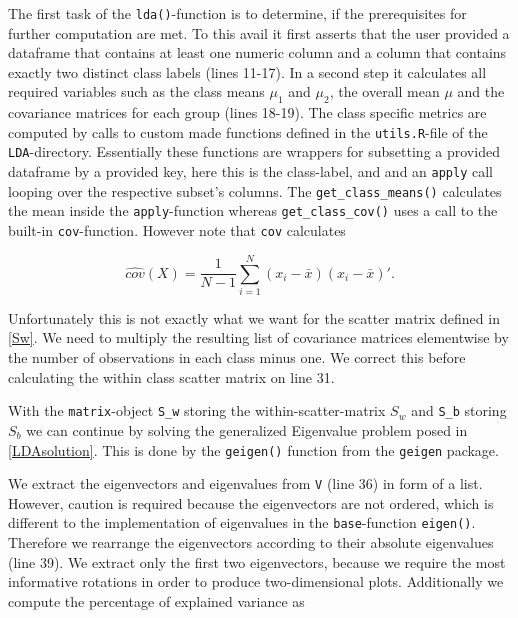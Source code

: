 \documentclass{article}
\begin{document}
The first task of the \texttt{lda()}-function is to determine, if the prerequisites for further computation are met. To this avail it first asserts that the user provided a dataframe that contains at least one numeric column and a column that contains exactly two distinct class labels (lines 11-17). In a second step it calculates all required variables such as the class means $\mu_1$ and $\mu_2$, the overall mean $\mu$ and the covariance matrices for each group (lines 18-19). The class specific metrics are computed by calls to custom made functions defined in the \texttt{utils.R}-file of the \texttt{LDA}-directory. Essentially these functions are wrappers for subsetting a provided dataframe by a provided key, here this is the class-label, and and an \texttt{apply} call looping over the respective subset's columns. The \texttt{get\_class\_means()} calculates the mean inside the \texttt{apply}-function whereas \texttt{get\_class\_cov()} uses a call to the built-in \texttt{cov}-function. However note that \texttt{cov} calculates 

$$\hat{cov}(X) = \frac{1}{N-1} \sum_{i = 1}^{N}(x_i - \bar{x})(x_i - \bar{x})\prime.$$

Unfortunately this is not exactly what we want for the scatter matrix defined in \ref{Sw}. We need to multiply the resulting list of covariance matrices elementwise by the number of observations in each class minus one. We correct this before calculating the within class scatter matrix on line 31. 



With the \texttt{matrix}-object \texttt{S\_w} storing the within-scatter-matrix $S_w$ and \texttt{S\_b} storing $S_b$ we can continue by solving the generalized Eigenvalue problem posed in \ref{LDAsolution}. This is done by the \texttt{geigen()} function from the \texttt{geigen} package.



We extract the eigenvectors and eigenvalues from \texttt{V} (line 36) in form of a list. However, caution is required because the eigenvectors are not ordered, which is different to the implementation of eigenvalues in the \texttt{base}-function \texttt{eigen()}. Therefore we rearrange the eigenvectors according to their absolute eigenvalues (line 39). We extract only the first two eigenvectors, because we require the most informative rotations in order to produce two-dimensional plots. Additionally we compute the percentage of explained variance as 
\end{document}
